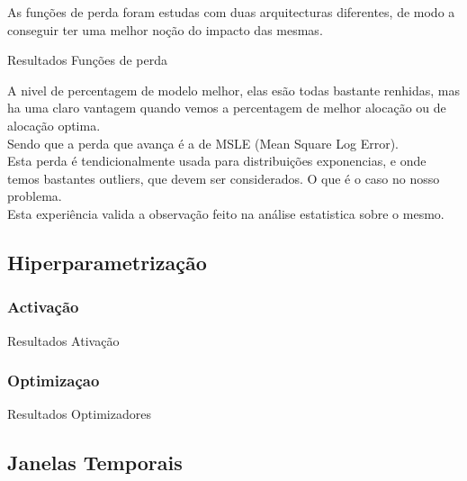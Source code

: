As funções de perda foram estudas com duas arquitecturas diferentes, de modo a conseguir ter uma melhor noção do impacto das mesmas.

\begin{table}[H]
\caption{Resultados Funções de perda}        
\resizebox{\linewidth}{!}{}
\end{table}

A nivel de percentagem de modelo melhor, elas esão todas bastante renhidas, mas ha uma claro vantagem quando vemos a percentagem de melhor alocação ou de alocação optima.\\
Sendo que a perda que avança é a de MSLE (Mean Square Log Error).\\
Esta perda é tendicionalmente usada para distribuições exponencias, e onde temos bastantes outliers, que devem ser considerados. O que é o caso no nosso problema.\\
Esta experiência valida a observação feito na análise estatistica sobre o mesmo.\\

\subsection{Hiperparametrização\label{se:hiper}}

\subsubsection{Activação\label{se:activ}}

\begin{table}[H]
\caption{Resultados Ativação}    
\resizebox{\linewidth}{!}{}
\end{table}

\subsubsection{Optimizaçao\label{se:opt}}

\begin{table}[H]
\caption{Resultados Optimizadores}    
\resizebox{\linewidth}{!}{}
\end{table}


\subsection{Janelas Temporais}

